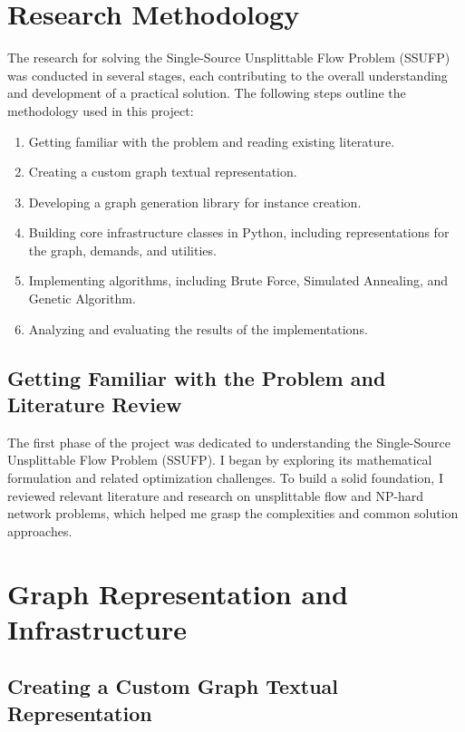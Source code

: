 \documentclass[a4paper,12pt]{article}
\begin{document}
\section{Research Methodology}

The research for solving the Single-Source Unsplittable Flow Problem (SSUFP) was conducted in several stages, each contributing to the overall understanding and development of a practical solution. The following steps outline the methodology used in this project:

\begin{enumerate}
    \item Getting familiar with the problem and reading existing literature.
    \item Creating a custom graph textual representation.
    \item Developing a graph generation library for instance creation.
    \item Building core infrastructure classes in Python, including representations for the graph, demands, and utilities.
    \item Implementing algorithms, including Brute Force, Simulated Annealing, and Genetic Algorithm.
    \item Analyzing and evaluating the results of the implementations.
\end{enumerate}

\subsection{Getting Familiar with the Problem and Literature Review}

The first phase of the project was dedicated to understanding the Single-Source Unsplittable Flow Problem (SSUFP). I began by exploring its mathematical formulation and related optimization challenges. To build a solid foundation, I reviewed relevant literature and research on unsplittable flow and NP-hard network problems, which helped me grasp the complexities and common solution approaches.

\section{Graph Representation and Infrastructure}

\subsection{Creating a Custom Graph Textual Representation}
\end{document}

